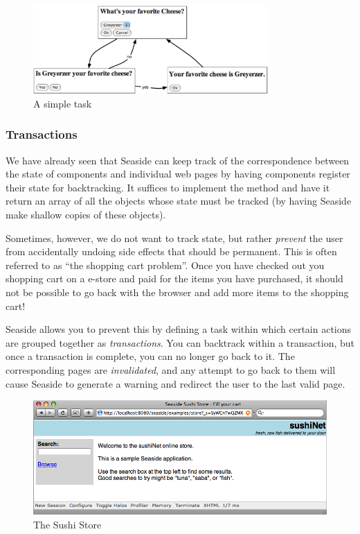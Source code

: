 \documentclass[a4paper,10pt,twoside]{book}
\begin{document}
\begin{figure}[ht]
\begin{center}
\includegraphics[width=0.8\textwidth]{chooseCheese}
\caption{A simple task}
\label{fig:chooseCheese}
\end{center}
\end{figure}

\subsubsection{Transactions}

We have already seen that Seaside can keep track of the correspondence between the state of components and individual web pages by having components register their state for backtracking.
It suffices to implement the method  and have it return an array of all the objects whose state must be tracked (\ie by having Seaside make shallow copies of these objects).

Sometimes, however, we do not want to track state, but rather \emph{prevent} the user from accidentally undoing side effects that should be permanent.
This is often referred to as ``the shopping cart problem''.
Once you have checked out you shopping cart on a e-store and paid for the items you have purchased, it should not be possible to go back with the browser and add more items to the shopping cart!

Seaside allows you to prevent this by defining a task within which certain actions are grouped together as \emph{transactions}.
You can backtrack within a transaction, but once a transaction is complete, you can no longer go back to it.
The corresponding pages are \emph{invalidated}, and any attempt to go back to them will cause Seaside to generate a warning and redirect the user to the last valid page.

\begin{figure}[ht]
\begin{center}
\includegraphics[width=\textwidth]{sushiStore}
\caption{The Sushi Store}
\label{fig:sushiStore}
\end{center}
\end{figure}
\end{document}
